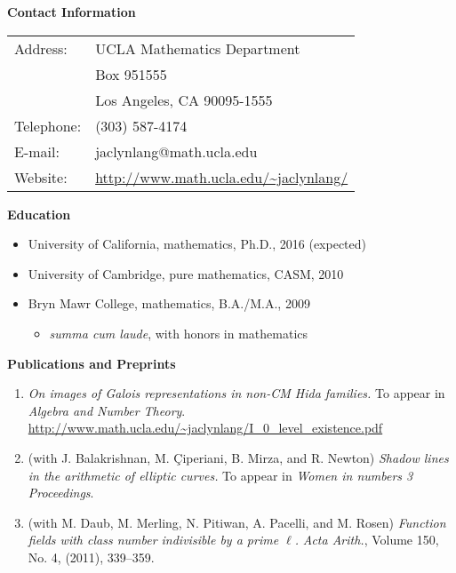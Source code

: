 \documentclass[10pt]{article}
\theoremstyle{plain} \numberwithin{equation}{section}
\theoremstyle{definition}
\begin{document}
\large{\textbf{Contact Information}}

\medskip

\begin{tabular}{ll}

Address: & UCLA Mathematics Department\\
  & Box 951555\\
  & Los Angeles, CA 90095-1555\\
Telephone: & (303) 587-4174\\
E-mail: & jaclynlang@math.ucla.edu\\
Website: & \url{http://www.math.ucla.edu/~jaclynlang/}\\

\end{tabular}

\bigskip

{\large\textbf{Education}}
\begin{itemize}
\item[] University of California, mathematics, Ph.D., 2016 (expected)
\item[] University of Cambridge, pure mathematics, CASM, 2010
\item[] Bryn Mawr College, mathematics, B.A./M.A., 2009
	\begin{itemize}
		\item[] \textit{summa cum laude}, with honors in mathematics
	\end{itemize}
\end{itemize}

{\large\textbf{Publications and Preprints}}

\begin{enumerate} 
\item \emph{On images of Galois representations in non-CM Hida families.} To appear in \textit{Algebra and Number Theory}. \url{http://www.math.ucla.edu/~jaclynlang/I_0_level_existence.pdf}

\item (with J. Balakrishnan, M. \c{C}iperiani, B. Mirza, and R. Newton) \emph{Shadow lines in the arithmetic of elliptic curves.} To appear in \textit{Women in numbers 3 Proceedings}.

\item (with M. Daub, M. Merling, N. Pitiwan, A. Pacelli, and M. Rosen) \emph{Function fields with class number indivisible by a prime $\ell$.} \textit{Acta Arith.}, Volume 150, No. 4, (2011), 339--359.
\end{enumerate}
\end{document}
